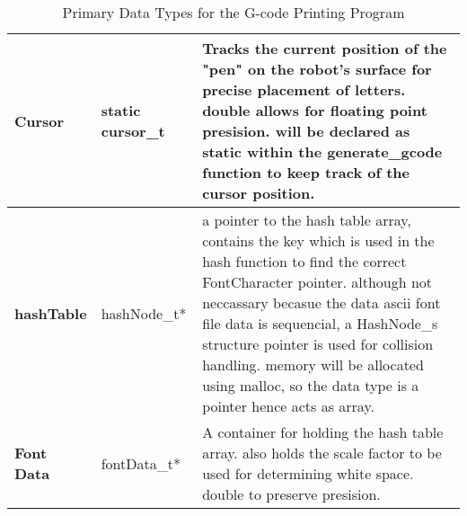 \begin{table}[h!]
{\begin{tabular}{|l|>{\raggedright\arraybackslash}m{}|>{\raggedright\arraybackslash}m{}|}
    \textbf{Cursor}       & 
    static cursor\_t
    & Tracks the current position of the "pen" on the robot's surface for precise placement of letters. double allows for floating point presision. will be declared as static within the generate\_gcode function to keep track of the cursor position. \\ \hline

    \textbf{hashTable} & 
    hashNode\_t*
    & a pointer to the hash table array, contains the key which is used in the hash function to find the correct FontCharacter pointer. although not neccassary becasue the data ascii font file data is sequencial, a HashNode\_s structure pointer is used for collision handling. memory will be allocated using malloc, so the data type is a pointer hence acts as array.\\ \hline
    
    \textbf{Font Data} & 
    fontData\_t*
    & A container for holding the hash table array. also holds the scale factor to be used for determining white space. double to preserve presision.\\ \hline
    
    \end{tabular}
    }
    \caption{Primary Data Types for the G-code Printing Program}
    \label{tab:data_types}
    \end{table}